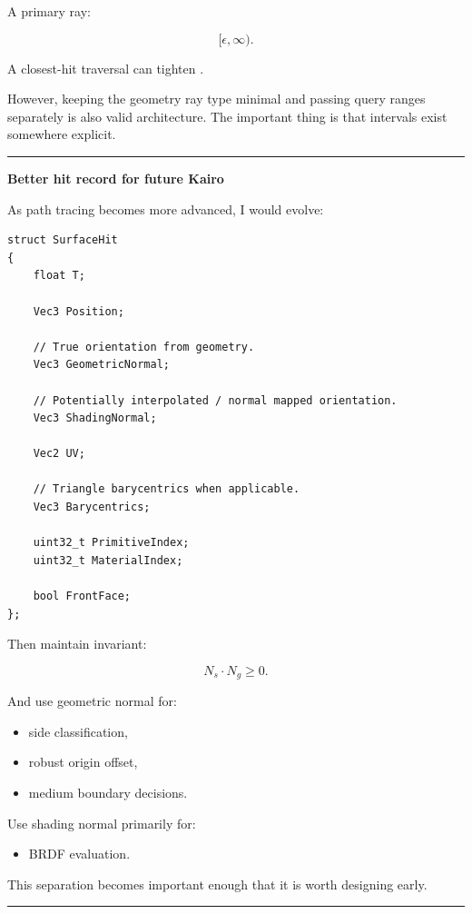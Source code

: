 A primary ray:

\[
[\epsilon,\infty).
\]

A closest-hit traversal can tighten .

However, keeping the geometry ray type minimal and passing query ranges separately is also valid architecture. The important thing is that intervals exist somewhere explicit.

\begin{center}\rule{0.5\linewidth}{0.5pt}\end{center}

\textbf{Better hit record for future Kairo}

As path tracing becomes more advanced, I would evolve:

\begin{verbatim}
struct SurfaceHit
{
    float T;

    Vec3 Position;

    // True orientation from geometry.
    Vec3 GeometricNormal;

    // Potentially interpolated / normal mapped orientation.
    Vec3 ShadingNormal;

    Vec2 UV;

    // Triangle barycentrics when applicable.
    Vec3 Barycentrics;

    uint32_t PrimitiveIndex;
    uint32_t MaterialIndex;

    bool FrontFace;
};
\end{verbatim}

Then maintain invariant:

\[
N_s\cdot N_g\ge0.
\]

And use geometric normal for:

\begin{itemize}
\tightlist
\item
  side classification,
\item
  robust origin offset,
\item
  medium boundary decisions.
\end{itemize}

Use shading normal primarily for:

\begin{itemize}
\tightlist
\item
  BRDF evaluation.
\end{itemize}

This separation becomes important enough that it is worth designing early.

\begin{center}\rule{0.5\linewidth}{0.5pt}\end{center}

